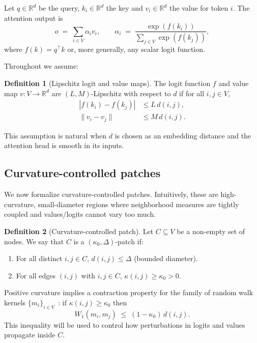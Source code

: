 \documentclass{article}
\theoremstyle{plain}
\theoremstyle{definition}
\newtheorem{definition}{Definition}
\theoremstyle{remark}
\newcommand{\RR}{\mathbb{R}}
\begin{document}
Let $q\in\RR^d$ be the query, $k_i\in\RR^d$ the key and $v_i\in\RR^d$ the value for token $i$. The attention output is
\begin{equation}
  o \;=\; \sum_{i\in V} \alpha_i v_i,\qquad
  \alpha_i \;=\; \frac{\exp(f(k_i))}{\sum_{j\in V} \exp(f(k_j))},
\end{equation}
where $f(k) = q^\top k$ or, more generally, any scalar logit function.

Throughout we assume:

\begin{definition}[Lipschitz logit and value maps]
The logit function $f$ and value map $v:V\to\RR^d$ are $(L,M)$-Lipschitz with respect to $d$ if for all $i,j\in V$,
\begin{align}
  |f(k_i) - f(k_j)| &\le L\, d(i,j), \\
  \|v_i - v_j\| &\le M\, d(i,j). \label{eq:value-lipschitz}
\end{align}
\end{definition}

This assumption is natural when $d$ is chosen as an embedding distance and the attention head is smooth in its inputs.

\subsection{Curvature-controlled patches}

We now formalize curvature-controlled patches. Intuitively, these are high-curvature, small-diameter regions where neighborhood measures are tightly coupled and values/logits cannot vary too much.

\begin{definition}[Curvature-controlled patch]
Let $C\subseteq V$ be a non-empty set of nodes. We say that $C$ is a $(\kappa_0,\Delta)$-patch if:
\begin{enumerate}
  \item For all distinct $i,j\in C$, $d(i,j)\le \Delta$ (bounded diameter).
  \item For all edges $(i,j)$ with $i,j\in C$, $\kappa(i,j) \ge \kappa_0 > 0$.
\end{enumerate}
\end{definition}

Positive curvature implies a contraction property for the family of random walk kernels $\{m_i\}_{i\in V}$~\citep{ollivier2009ricci}: if $\kappa(i,j)\ge\kappa_0$ then
\begin{equation}
  W_1(m_i, m_j) \;\le\; (1-\kappa_0)\, d(i,j).
  \label{eq:contraction}
\end{equation}
This inequality will be used to control how perturbations in logits and values propagate inside $C$.
\end{document}
